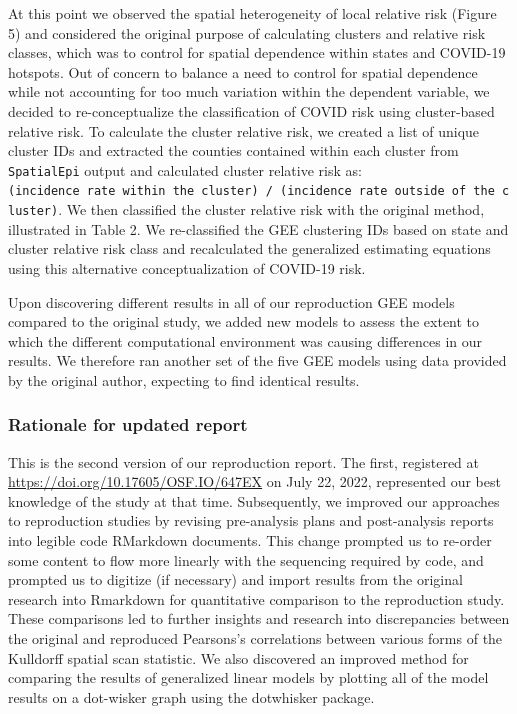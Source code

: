 \documentclass[
]{article}
\begin{document}
At this point we observed the spatial heterogeneity of local relative
risk (Figure 5) and considered the original purpose of calculating
clusters and relative risk classes, which was to control for spatial
dependence within states and COVID-19 hotspots. Out of concern to
balance a need to control for spatial dependence while not accounting
for too much variation within the dependent variable, we decided to
re-conceptualize the classification of COVID risk using cluster-based
relative risk. To calculate the cluster relative risk, we created a list
of unique cluster IDs and extracted the counties contained within each
cluster from \texttt{SpatialEpi} output and calculated cluster relative
risk as:
\texttt{(incidence\ rate\ within\ the\ cluster)\ /\ (incidence\ rate\ outside\ of\ the\ cluster)}.
We then classified the cluster relative risk with the original method,
illustrated in Table 2. We re-classified the GEE clustering IDs based on
state and cluster relative risk class and recalculated the generalized
estimating equations using this alternative conceptualization of
COVID-19 risk.

Upon discovering different results in all of our reproduction GEE models
compared to the original study, we added new models to assess the extent
to which the different computational environment was causing differences
in our results. We therefore ran another set of the five GEE models
using data provided by the original author, expecting to find identical
results.

\hypertarget{rationale-for-updated-report}{%
\subsubsection{Rationale for updated
report}\label{rationale-for-updated-report}}

This is the second version of our reproduction report. The first,
registered at \url{https://doi.org/10.17605/OSF.IO/647EX} on July 22,
2022, represented our best knowledge of the study at that time.
Subsequently, we improved our approaches to reproduction studies by
revising pre-analysis plans and post-analysis reports into legible code
RMarkdown documents. This change prompted us to re-order some content to
flow more linearly with the sequencing required by code, and prompted us
to digitize (if necessary) and import results from the original research
into Rmarkdown for quantitative comparison to the reproduction study.
These comparisons led to further insights and research into
discrepancies between the original and reproduced Pearsons's
correlations between various forms of the Kulldorff spatial scan
statistic. We also discovered an improved method for comparing the
results of generalized linear models by plotting all of the model
results on a dot-wisker graph using the dotwhisker package.
\end{document}
